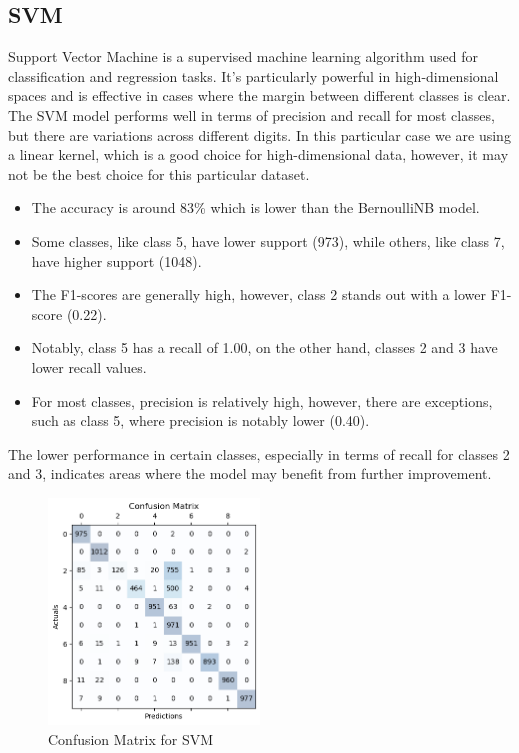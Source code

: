 \documentclass{article}
\begin{document}
\begin{titlepage}
  \section{SVM}
  Support Vector Machine is a supervised machine learning algorithm used for classification and regression tasks. It's particularly powerful in high-dimensional spaces and is effective in cases where the margin between different classes is clear.
  \newline
  \newline
  The SVM model performs well in terms of precision and recall for most classes, but there are variations across different digits.
  \newline
  In this particular case we are using a linear kernel, which is a good choice for high-dimensional data, however, it may not be the best choice for this particular dataset.

  \begin{itemize}
    \item The accuracy is around 83\% which is lower than the BernoulliNB model.
    \item Some classes, like class 5, have lower support (973), while others, like class 7, have higher support (1048).
    \item The F1-scores are generally high, however, class 2 stands out with a lower F1-score (0.22).
    \item Notably, class 5 has a recall of 1.00, on the other hand, classes 2 and 3 have lower recall values.
    \item For most classes, precision is relatively high, however, there are exceptions, such as class 5, where precision is notably lower (0.40).
  \end{itemize}

  The lower performance in certain classes, especially in terms of recall for classes 2 and 3, indicates areas where the model may benefit from further improvement.

  \begin{figure}[htbp]
    \centering
    \includegraphics[width=0.5\textwidth]{SVMCM.png}
    \caption{Confusion Matrix for SVM}
    \label{fig:sample2}
  \end{figure}

\end{titlepage}
\end{document}
